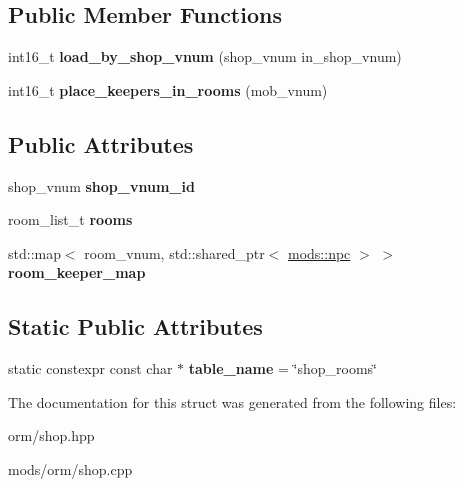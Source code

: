 \subsection*{Public Member Functions}
\begin{DoxyCompactItemize}
\item 
\mbox{\label{structmods_1_1orm_1_1shop__rooms_a9facf0b45b67f151123ca490018e53a3}} 
int16\+\_\+t {\bfseries load\+\_\+by\+\_\+shop\+\_\+vnum} (shop\+\_\+vnum in\+\_\+shop\+\_\+vnum)
\item 
\mbox{\label{structmods_1_1orm_1_1shop__rooms_aaf9b2135573447f06f3a43a8ae4ec7d4}} 
int16\+\_\+t {\bfseries place\+\_\+keepers\+\_\+in\+\_\+rooms} (mob\+\_\+vnum)
\end{DoxyCompactItemize}
\subsection*{Public Attributes}
\begin{DoxyCompactItemize}
\item 
\mbox{\label{structmods_1_1orm_1_1shop__rooms_a814b8d068d4fbe86e3e35895aa3c7051}} 
shop\+\_\+vnum {\bfseries shop\+\_\+vnum\+\_\+id}
\item 
\mbox{\label{structmods_1_1orm_1_1shop__rooms_a289e2ea54a8dd616a3cc7c91a408b79c}} 
room\+\_\+list\+\_\+t {\bfseries rooms}
\item 
\mbox{\label{structmods_1_1orm_1_1shop__rooms_a35b5c0768c0c7b0281f81aca6790b8cb}} 
std\+::map$<$ room\+\_\+vnum, std\+::shared\+\_\+ptr$<$ \hyperlink{structmods_1_1npc}{mods\+::npc} $>$ $>$ {\bfseries room\+\_\+keeper\+\_\+map}
\end{DoxyCompactItemize}
\subsection*{Static Public Attributes}
\begin{DoxyCompactItemize}
\item 
\mbox{\label{structmods_1_1orm_1_1shop__rooms_a227f31310ec4e7de47e61fa6a8214bd0}} 
static constexpr const char $\ast$ {\bfseries table\+\_\+name} = \char`\"{}shop\+\_\+rooms\char`\"{}
\end{DoxyCompactItemize}


The documentation for this struct was generated from the following files\+:\begin{DoxyCompactItemize}
\item 
orm/shop.\+hpp\item 
mods/orm/shop.\+cpp\end{DoxyCompactItemize}
